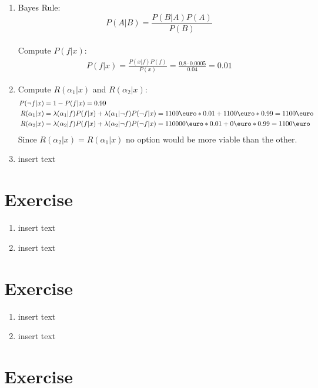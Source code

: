 \documentclass[a4paper]{article}
\begin{document}
		\begin{enumerate}[label={(\alph*)}]
		\item				
				Bayes Rule: $$ P(A|B)=\frac{P(B|A)P(A)}{P(B)}$$\\
				Compute	$P(f|x)$: 
				\begin{align*}
					P(f|x) = \frac{P(x|f)P(f)}{P(x)} = \frac{0.8 \cdot 0.0005}{0.04} = 0.01
				\end{align*}
		\item 
		Compute $R(\alpha_1|x)$ and $R(\alpha_2|x)$:\\
		\begin{align*}
		    P(\neg f|x) &= 1 - P(f|x) = 0.99\\
			R(\alpha_1|x) &= \lambda(\alpha_1|f)P(f|x) + \lambda(\alpha_1|\neg f)P(\neg f|x) = 1100\text{\euro} * 0.01 + 1100\text{\euro} * 0.99 = 1100\text{\euro}\\
			R(\alpha_2|x) &= \lambda(\alpha_2|f)P(f|x) + \lambda(\alpha_2|\neg f)P(\neg f|x) = 110000\text{\euro} * 0.01 + 0\text{\euro} * 0.99 = 1100\text{\euro}
		\end{align*}
		Since $R(\alpha_2|x)=R(\alpha_1|x)$ no option would be more viable than the other.
		\item insert text
	\end{enumerate}
	\section{Exercise}
		\begin{enumerate}[label={(\alph*)}]
			\item insert text
			\item insert text
		\end{enumerate}
	\section{Exercise}
		\begin{enumerate}[label={(\alph*)}]
			\item insert text
			\item insert text
		\end{enumerate}
	\section{Exercise}
\end{document}
